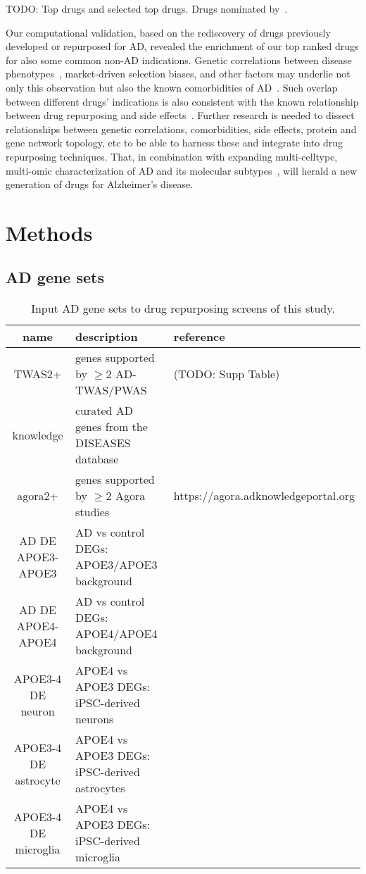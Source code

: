 \documentclass[letterpaper]{article}
\begin{document}
TODO: Top drugs and selected top drugs.  Drugs nominated
by~\cite{Fang2021,Taubes2021}.

Our computational validation, based on the rediscovery of drugs previously
developed or repurposed for AD, revealed the enrichment of our top ranked
drugs for also some common non-AD indications.  Genetic correlations between
disease phenotypes~\citep{Consortium2018}, market-driven selection biases, and
other factors may underlie not only this observation but also the known
comorbidities of AD~\citep{Santiago2021}.  Such overlap between different
drugs' indications is also consistent with the known relationship between drug
repurposing and side effects~\citep{Ye2014}.  Further research is needed to
dissect relationships between genetic correlations, comorbidities, side
effects, protein and gene network topology, etc to be able to harness these and
integrate into drug repurposing techniques.  That, in combination with
expanding multi-celltype, multi-omic characterization of AD and its molecular
subtypes~\citep{Neff2021}, will herald a new generation of drugs for
Alzheimer's disease.

\section{Methods}

\subsection{AD gene sets}

\begin{table}
\footnotesize
\begin{tabular}{cll}
name     & description & reference  \\
\hline
TWAS2+   & genes supported by $\ge 2$ AD-TWAS/PWAS & (TODO: Supp Table)  \\
knowledge& curated AD genes from the DISEASES database & \cite{PletscherFrankild2015} \\
agora2+  & genes supported by $\ge 2$ Agora studies & https://agora.adknowledgeportal.org \\
AD DE APOE3-APOE3 & AD vs control DEGs: APOE3/APOE3 background & \cite{Taubes2021} \\
AD DE APOE4-APOE4 & AD vs control DEGs: APOE4/APOE4 background & \cite{Taubes2021} \\
APOE3-4 DE neuron & APOE4 vs APOE3 DEGs: iPSC-derived neurons& \cite{Lin2018} \\
APOE3-4 DE astrocyte & APOE4 vs APOE3 DEGs: iPSC-derived astrocytes& \cite{Lin2018} \\
APOE3-4 DE microglia & APOE4 vs APOE3 DEGs: iPSC-derived microglia& \cite{Lin2018} \\
\end{tabular}
\caption{
Input AD gene sets to drug repurposing screens of this study.
}
\label{tab:genesets}
\end{table}
\end{document}
